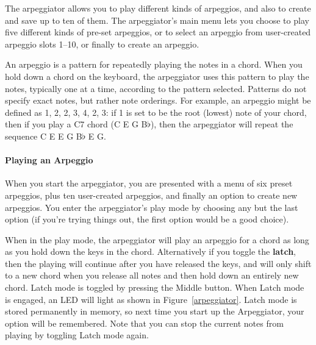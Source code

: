 \documentclass{article}
\begin{document}
The arpeggiator allows you to play different kinds of arpeggios, and also to create and save up to ten of them.  The arpeggiator's main menu lets you choose to play five different kinds of pre-set arpeggios, or to select an arpeggio from user-created arpeggio slots 1--10, or finally to create an arpeggio.

An arpeggio is a pattern for repeatedly playing the notes in a chord.  When you hold down a chord on the keyboard, the arpeggiator uses this pattern to play the notes, typically one at a time, according to the pattern selected.  Patterns do not specify exact notes, but rather note orderings.  For example, an arpeggio might be defined as 1, 2, 2, 3, 4, 2, 3: if 1 is set to be the root (lowest) note of your chord, then if you play a C7 chord (C E G B$\flat$), then the arpeggiator will repeat the sequence C E E G B$\flat$ E G.   

\paragraph{Playing an Arpeggio}

When you start the arpeggiator, you are presented with a menu of six preset arpeggios, plus ten user-created arpeggios, and finally an option to create new arpeggios.  You enter the arpeggiator's play mode by choosing any but the last option (if you're trying things out, the first option would be a good choice).

When in the play mode, the arpeggiator will play an arpeggio for a chord as long as you hold down the keys in the chord.  Alternatively if you toggle the {\bf latch}, then the playing will continue after you have released the keys, and will only shift to a new chord when you release all notes and then hold down an entirely new chord.  Latch mode is toggled by pressing the Middle button.  When Latch mode is engaged, an LED will light as shown in Figure~\ref{arpeggiator}.  Latch mode is stored permanently in memory, so next time you start up the Arpeggiator, your option will be remembered.  Note that you can stop the current notes from playing by toggling Latch mode again.
\end{document}

